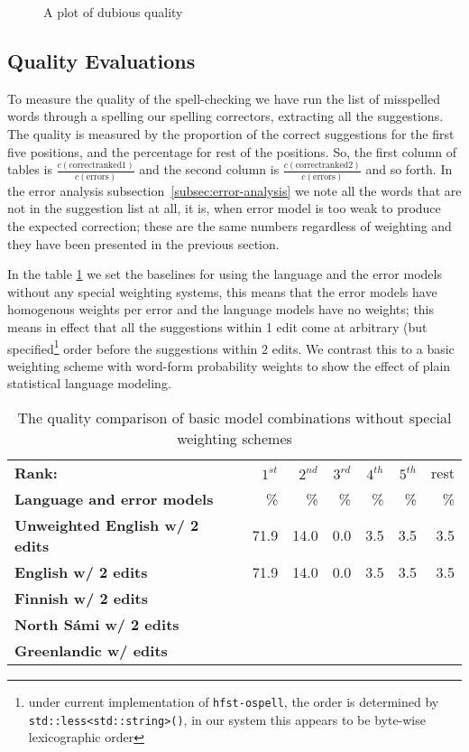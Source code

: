 \documentclass[a4paper,12pt]{article}
\begin{document}
\begin{figure}
    \centering
    \caption{A plot of dubious quality
    \label{fig:coverage}}
\end{figure}

\subsection{Quality Evaluations}

To measure the quality of the spell-checking we have run the list of misspelled
words through a spelling our spelling correctors, extracting all the
suggestions.  The quality is measured by the proportion of the correct
suggestions for the first five positions, and the percentage for rest of the
positions. So, the first column of tables is $\frac{c(\mathrm{correct ranked
1})}{c(\mathrm{errors})}$ and the second column is $\frac{c(\mathrm{correct
ranked 2})}{c(\mathrm{errors})}$ and so forth.  In the error analysis
subsection~\ref{subsec:error-analysis} we note all the words that are not in
the suggestion list at all, it is, when error model is too weak to produce the
expected correction; these are the same numbers regardless of weighting and
they have been presented in the previous section.

In the table \ref{table:baseline-quality} we set the baselines for using the
language and the error models without any special weighting systems, this means
that the error models have homogenous weights per error and the language models
have no weights; this means in effect that all the suggestions within 1 edit
come at arbitrary (but specified\footnote{under current implementation of
\texttt{hfst-ospell}, the order is determined by
\texttt{std::less<std::string>()}, in our system this appears to be byte-wise
lexicographic order} order before the suggestions within 2 edits.  We contrast
this to a basic weighting scheme with word-form probability weights to show the
effect of plain statistical language modeling.

\begin{table}
    \centering
    \begin{tabular}{|l|r|r|r|r|r|r|}
        \hline
        \bf Rank: & $1^{st}$ & $2^{nd}$ & $3^{rd}$ & $4^{th}$ & $5^{th}$ & rest \\
        \bf Language and error models &  \% & \% & \% & \% & \% & \% \\
        \hline
\bf Unweighted English w/ 2 edits & 71.9 & 14.0 & 0.0 & 3.5 & 3.5 & 3.5 \\
        \bf English w/ 2 edits & 71.9 & 14.0 & 0.0 & 3.5 & 3.5 & 3.5 \\
        \hline
        \bf Finnish w/ 2 edits & & & & & \\
        \hline
        \bf North Sámi w/ 2 edits & & & & & \\
        \hline
        \bf Greenlandic w/ edits & & & & & \\
        \hline
    \end{tabular}
    \caption{The quality comparison of basic model combinations without special
    weighting schemes\label{table:baseline-quality}}
\end{table}
\end{document}
